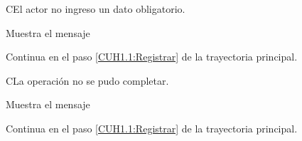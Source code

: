 \begin{UCtrayectoriaA}{C}{El actor no ingreso un dato obligatorio.}
		
	\UCpaso[\UCsist] Muestra el mensaje 
	
	\UCpaso Continua en el paso \ref{CUH1.1:Registrar} de la trayectoria principal.
		
\end{UCtrayectoriaA}

\begin{UCtrayectoriaA}{C}{La operación no se pudo completar.}
		
	\UCpaso[\UCsist] Muestra el mensaje 
		
	\UCpaso Continua en el paso \ref{CUH1.1:Registrar} de la trayectoria principal.
		
\end{UCtrayectoriaA}
